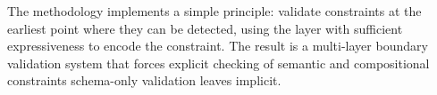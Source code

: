 The methodology implements a simple principle: validate constraints at the earliest point where they can be detected, using the layer with sufficient expressiveness to encode the constraint. The result is a multi-layer boundary validation system that forces explicit checking of semantic and compositional constraints schema-only validation leaves implicit.
